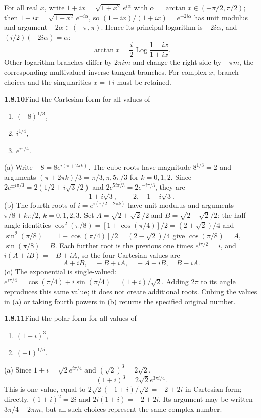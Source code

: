 For all real $x$, write $1+ix=\sqrt{1+x^2}\,e^{i\alpha}$ with
$\alpha=\arctan x\in(-\pi/2,\pi/2)$; then $1-ix=\sqrt{1+x^2}\,e^{-i\alpha}$,
so $(1-ix)/(1+ix)=e^{-2i\alpha}$ has unit modulus and argument
$-2\alpha\in(-\pi,\pi)$. Hence its principal logarithm is $-2i\alpha$,
and $(i/2)(-2i\alpha)=\alpha$:
\[
 \boxed{\arctan x=\frac i2\operatorname{Log}\frac{1-ix}{1+ix}}.
\]
Other logarithm branches differ by $2\pi i m$ and change the right
side by $-\pi m$, the corresponding multivalued inverse-tangent branches.
For complex $x$, branch choices and the singularities $x=\pm i$
must be retained.


\par\bigskip
\noindent\textbf{1.8.10}\quad Find the Cartesian form for all values of
\begin{enumerate}
\item[(a)] $(-8)^{1/3}$,
\item[(b)] $i^{1/4}$,
\item[(c)] $e^{i\pi/4}$.
\end{enumerate}
\solution
(a) Write $-8=8e^{i(\pi+2\pi k)}$. The cube roots have magnitude
$8^{1/3}=2$ and arguments $(\pi+2\pi k)/3=\pi/3,\pi,5\pi/3$ for
$k=0,1,2$. Since $2e^{\pm i\pi/3}=2(1/2\pm i\sqrt3/2)$ and
$2e^{5i\pi/3}=2e^{-i\pi/3}$, they are
\[
 \boxed{1+i\sqrt3,\quad-2,\quad1-i\sqrt3}.
\]
(b) The fourth roots of $i=e^{i(\pi/2+2\pi k)}$ have unit modulus and
arguments $\pi/8+k\pi/2$, $k=0,1,2,3$. Set
$A=\sqrt{2+\sqrt2}/2$ and $B=\sqrt{2-\sqrt2}/2$; the half-angle
identities $\cos^2(\pi/8)=[1+\cos(\pi/4)]/2=(2+\sqrt2)/4$ and
$\sin^2(\pi/8)=[1-\cos(\pi/4)]/2=(2-\sqrt2)/4$ give
$\cos(\pi/8)=A$, $\sin(\pi/8)=B$. Each further root is the previous one
times $e^{i\pi/2}=i$, and $i(A+iB)=-B+iA$, so the four Cartesian
values are
\[
 \boxed{A+iB,\quad-B+iA,\quad-A-iB,\quad B-iA}.
\]
(c) The exponential is single-valued:
$\boxed{e^{i\pi/4}=\cos(\pi/4)+i\sin(\pi/4)=(1+i)/\sqrt2}$.
Adding $2\pi$ to its angle reproduces this same value; it does not
create additional roots. Cubing the values in (a) or taking fourth
powers in (b) returns the specified original number.


\par\bigskip
\noindent\textbf{1.8.11}\quad Find the polar form for all values of
\begin{enumerate}
\item[(a)] $(1+i)^{3}$,
\item[(b)] $(-1)^{1/5}$.
\end{enumerate}
\solution
(a) Since $1+i=\sqrt2 e^{i\pi/4}$ and $(\sqrt2)^3=2\sqrt2$,
\[
 \boxed{(1+i)^3=2\sqrt2 e^{3\pi i/4}}.
\]
This is one value, equal to $2\sqrt2(-1+i)/\sqrt2=-2+2i$ in Cartesian
form; directly, $(1+i)^2=2i$ and $2i(1+i)=-2+2i$. Its argument
may be written $3\pi/4+2\pi m$, but all such choices represent the
same complex number.

